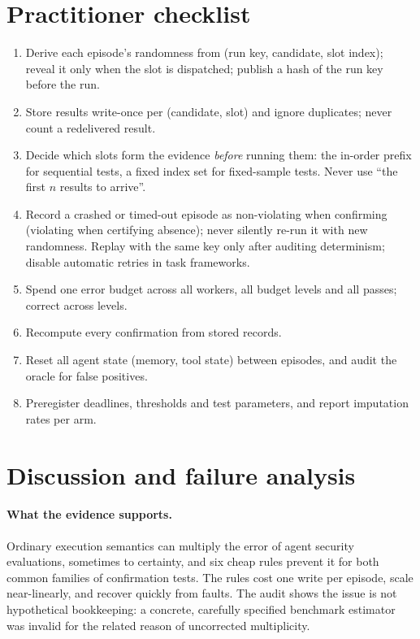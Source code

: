 \documentclass[11pt]{article}
\theoremstyle{definition}
\begin{document}
\section{Practitioner checklist}\label{sec:checklist}
\begin{enumerate}
\item Derive each episode's randomness from (run key, candidate, slot index); reveal it only when the slot is dispatched; publish a hash of the run key before the run.
\item Store results write-once per (candidate, slot) and ignore duplicates; never count a redelivered result.
\item Decide which slots form the evidence \emph{before} running them: the in-order prefix for sequential tests, a fixed index set for fixed-sample tests. Never use ``the first $n$ results to arrive''.
\item Record a crashed or timed-out episode as non-violating when confirming (violating when certifying absence); never silently re-run it with new randomness. Replay with the same key only after auditing determinism; disable automatic retries in task frameworks.
\item Spend one error budget across all workers, all budget levels and all passes; correct across levels.
\item Recompute every confirmation from stored records.
\item Reset all agent state (memory, tool state) between episodes, and audit the oracle for false positives.
\item Preregister deadlines, thresholds and test parameters, and report imputation rates per arm.
\end{enumerate}

\section{Discussion and failure analysis}\label{sec:discussion}

\paragraph{What the evidence supports.} Ordinary execution semantics can multiply the error of agent security evaluations, sometimes to certainty, and six cheap rules prevent it for both common families of confirmation tests. The rules cost one write per episode, scale near-linearly, and recover quickly from faults. The audit shows the issue is not hypothetical bookkeeping: a concrete, carefully specified benchmark estimator was invalid for the related reason of uncorrected multiplicity.
\end{document}
